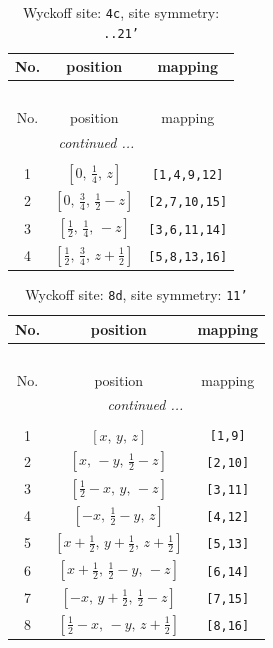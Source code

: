 \documentclass[fleqn,8pt]{jsarticle}
\begin{document}
\renewcommand{\arraystretch}{1.2}
\begin{longtable}{ccc}
\caption{Wyckoff site: {\tt 4c}, site symmetry: {\tt ..21'}}
 \\
 \hline \hline
No. & position & mapping \\ \hline \endfirsthead

\multicolumn{2}{l}{\tablename\ \thetable{}} \\
 \hline \hline
No. & position & mapping \\ \hline \endhead

 \hline \hline
\multicolumn{2}{r}{\footnotesize\it continued ...} \\ \endfoot

 \hline \hline
\multicolumn{2}{r}{} \\ \endlastfoot

1 & $\left[ 0,\, \frac{1}{4},\, z \right]$ & {\tt [1,4,9,12]} \\ \hline
2 & $\left[ 0,\, \frac{3}{4},\, \frac{1}{2} - z \right]$ & {\tt [2,7,10,15]} \\ \hline
3 & $\left[ \frac{1}{2},\, \frac{1}{4},\, - z \right]$ & {\tt [3,6,11,14]} \\ \hline
4 & $\left[ \frac{1}{2},\, \frac{3}{4},\, z + \frac{1}{2} \right]$ & {\tt [5,8,13,16]} \\
\end{longtable}
\renewcommand{\arraystretch}{1.2}
\begin{longtable}{ccc}
\caption{Wyckoff site: {\tt 8d}, site symmetry: {\tt 11'}}
 \\
 \hline \hline
No. & position & mapping \\ \hline \endfirsthead

\multicolumn{2}{l}{\tablename\ \thetable{}} \\
 \hline \hline
No. & position & mapping \\ \hline \endhead

 \hline \hline
\multicolumn{2}{r}{\footnotesize\it continued ...} \\ \endfoot

 \hline \hline
\multicolumn{2}{r}{} \\ \endlastfoot

1 & $\left[ x,\, y,\, z \right]$ & {\tt [1,9]} \\ \hline
2 & $\left[ x,\, - y,\, \frac{1}{2} - z \right]$ & {\tt [2,10]} \\ \hline
3 & $\left[ \frac{1}{2} - x,\, y,\, - z \right]$ & {\tt [3,11]} \\ \hline
4 & $\left[ - x,\, \frac{1}{2} - y,\, z \right]$ & {\tt [4,12]} \\ \hline
5 & $\left[ x + \frac{1}{2},\, y + \frac{1}{2},\, z + \frac{1}{2} \right]$ & {\tt [5,13]} \\ \hline
6 & $\left[ x + \frac{1}{2},\, \frac{1}{2} - y,\, - z \right]$ & {\tt [6,14]} \\ \hline
7 & $\left[ - x,\, y + \frac{1}{2},\, \frac{1}{2} - z \right]$ & {\tt [7,15]} \\ \hline
8 & $\left[ \frac{1}{2} - x,\, - y,\, z + \frac{1}{2} \right]$ & {\tt [8,16]} \\
\end{longtable}
\end{document}
